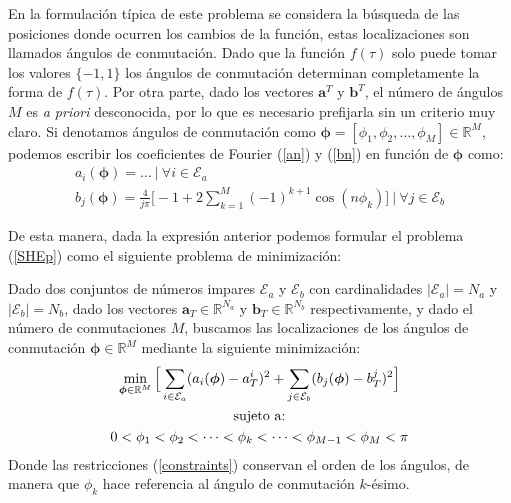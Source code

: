 En la formulación típica de este problema se considera la búsqueda de las posiciones donde ocurren los cambios de la función, estas localizaciones son llamados ángulos de conmutación. Dado que la función $f(\tau)$ solo puede tomar los valores $\{-1,1\}$ los ángulos de conmutación determinan completamente la forma de $f(\tau)$.
%
Por otra parte, dado los vectores $\bm{a}^T$ y $\bm{b}^T$, el número de ángulos $M$ es \emph{a priori} desconocida, por lo que es necesario prefijarla sin un criterio muy claro.
%
Si denotamos ángulos de conmutación como $\bm{\phi} = [\phi_1,\phi_2,\dots,\phi_M] \in \mathbb{R}^M $,  podemos escribir los coeficientes de Fourier (\ref{an}) y (\ref{bn}) en función de $\bm{\phi}$ como: 
\begin{gather}
    a_i(\bm{\phi})  = \dots  \ | \ \forall i \in \mathcal{E}_a \\
    b_j(\bm{\phi})  =  \frac{4}{j\pi  } \bigg[ -1 + 2\sum_{k=1}^M  (-1)^{k+1}\cos(n\phi_k) \bigg] \ | \ \forall j \in \mathcal{E}_b
\end{gather}

De esta manera, dada la expresión anterior podemos formular el problema (\ref{SHEp}) como el siguiente problema de minimización:

\begin{problem}\label{SHEp_clas}
    Dado dos conjuntos de números impares $\mathcal{E}_a$ y $\mathcal{E}_b$ con cardinalidades $|\mathcal{E}_a| = N_a$ y  $|\mathcal{E}_b| = N_b$,  dado los vectores $\bm{a}_T  \in \mathbb{R}^{N_a}$ y $\bm{b}_T  \in \mathbb{R}^{N_b}$ respectivamente, y dado el número de conmutaciones $M$, buscamos las localizaciones de los ángulos de conmutación $\bm{\phi} \in \mathbb{R}^M$ mediante la siguiente minimización:
    \begin{gather}
        \min_{\bm{\phi} \in \mathbb{R}^M} \Big[
        \sum_{i \in \mathcal{E}_a} (a_i(\bm{\phi}) - a^i_T)^2 + 
        \sum_{j \in \mathcal{E}_b} (b_j(\bm{\phi}) - b^j_T)^2  
        \Big] \\
        \notag \text{sujeto a:} \\ 
            0 < \phi_1  < \phi_2 < \dots  < \phi_k < \dots < \phi_{M-1}  <   \phi_{M} < \pi
        \label{constraints}
    \end{gather} 
    Donde las restricciones (\ref{constraints})  conservan el orden de los ángulos, de manera que $\phi_k$ hace referencia al ángulo de conmutación $k$-ésimo. 
    
\end{problem}

